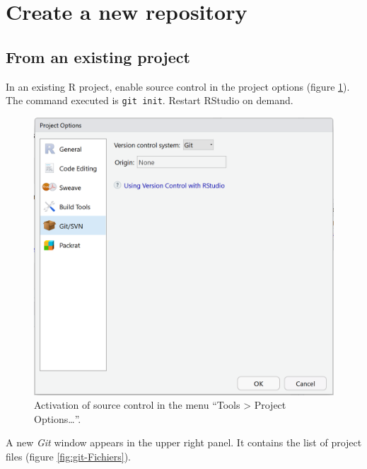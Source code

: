 \documentclass[
  12pt,
  american,
  a4paper,
  extrafontsizes,onecolumn,openright
  ]{memoir}
\begin{document}
\hypertarget{sec:creerdepot}{%
\section{Create a new repository}\label{sec:creerdepot}}

\hypertarget{from-an-existing-project}{%
\subsection{From an existing project}\label{from-an-existing-project}}

In an existing R project, enable source control in the project options (figure \ref{fig:git-Project}).
The command executed is \texttt{git\ init}.
Restart RStudio on demand.



\scriptsize

\begin{figure}

{\centering \includegraphics[width=0.8\linewidth]{images/git-Project} 

}

\caption{Activation of source control in the menu \enquote{Tools \textgreater{} Project Options\ldots{}}.}\label{fig:git-Project}
\end{figure}

\normalsize

A new \emph{Git} window appears in the upper right panel.
It contains the list of project files (figure \ref{fig:git-Fichiers}).



\scriptsize
\end{document}
